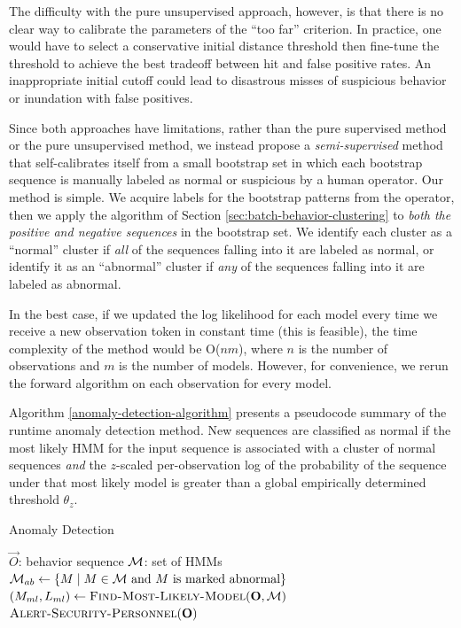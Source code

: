 The difficulty with the pure unsupervised approach, however, is that
there is no clear way to calibrate the parameters of the ``too far''
criterion.  In practice, one would have to select a conservative
initial distance threshold then fine-tune the threshold to achieve the
best tradeoff between hit and false positive rates.  An inappropriate
initial cutoff could lead to disastrous misses of suspicious behavior
or inundation with false positives.

Since both approaches have limitations, rather than the pure
supervised method or the pure unsupervised method, we instead propose
a \textit{semi-supervised} method that self-calibrates itself from a
small bootstrap set in which each bootstrap sequence is manually
labeled as normal or suspicious by a human operator.  Our method is
simple.  We acquire labels for the bootstrap patterns from the
operator, then we apply the algorithm of
Section \ref{sec:batch-behavior-clustering} to
\textit{both the positive and negative sequences} in the bootstrap
set.  We identify each cluster as a ``normal'' cluster if \textit{all}
of the sequences falling into it are labeled as normal, or identify it
as an ``abnormal'' cluster if \textit{any} of the sequences falling
into it are labeled as abnormal.

In the best case, if we updated
the log likelihood for each model every time we receive a new
observation token in constant time (this is feasible), the time 
complexity of the method would be O($nm$),
where $n$ is the number of observations and $m$ is the number of
models. However, for convenience, we rerun the forward
algorithm  on each observation for every
model.

Algorithm \ref{anomaly-detection-algorithm} presents a pseudocode summary of
the runtime anomaly detection method. New sequences are classified as
normal if the most likely HMM for the input sequence is associated
with a cluster of normal sequences \textit{and} the $z$-scaled
per-observation log of the probability of the sequence under that most likely
model is greater than a global empirically determined threshold
$\theta_z$.

\begin{algorithm}[t]
  \caption{Anomaly Detection}
  \label{anomaly-detection-algorithm}
  \begin{algorithmic}
    \REQUIRE $\vec{O}$: behavior sequence
    \REQUIRE ${\cal M}$: set of HMMs
    \STATE ${\cal M}_{ab} \gets \{ M \mid M \in {\cal M} \text{~and $M$ is marked abnormal} \}$
    \STATE $( M_{ml}, L_{ml} ) \gets \textsc{Find-Most-Likely-Model}(\vec{O}, {\cal M})$
      \STATE $\textsc{Alert-Security-Personnel}(\vec{O})$
    \ENDIF
  \end{algorithmic}
\end{algorithm}

